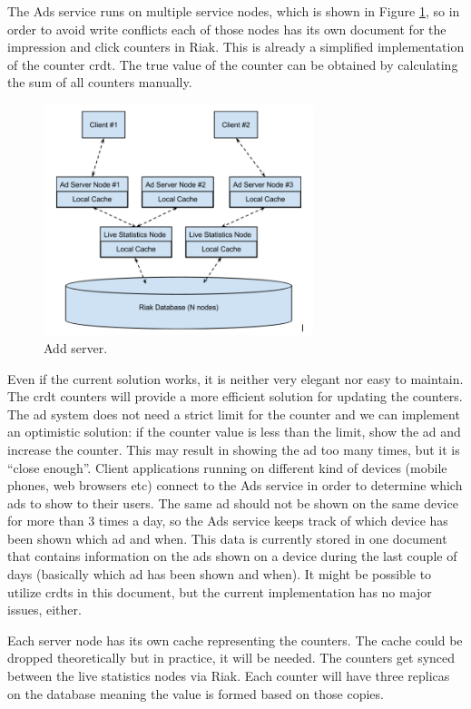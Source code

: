 \documentclass[11pt,a4paper]{report}
\begin{document}
The Ads service runs on multiple service nodes, which is shown in Figure \ref{fig:add_server}, so in order to avoid write conflicts each of those nodes has its own document for the impression and click counters in Riak. This is already a simplified implementation of the counter \gls{crdt}. The true value of the counter can be obtained by calculating the sum of all counters manually.
\begin{figure}[!h]
	\centering
	\includegraphics[width=0.7\textwidth]{./img/image1.png}
	
	\caption{Add server.}
	\label{fig:add_server}
\end{figure}

Even if the current solution works, it is neither very elegant nor easy to maintain. The \gls{crdt} counters will provide a more efficient solution for updating the counters. The ad system does not need a strict limit for the counter and we can implement an optimistic solution: if the counter value is less than the limit, show the ad and increase the counter. This may result in showing the ad too many times, but it is ``close enough''. Client applications running on different kind of devices (mobile phones, web browsers etc) connect to the Ads service in order to determine which ads to show to their users. The same ad should not be shown on the same device for more than 3 times a day, so the Ads service keeps track of which device has been shown which ad and when. This data is currently stored in one document that contains information on the ads shown on a device during the last couple of days (basically which ad has been shown and when). It might be possible to utilize \glspl{crdt} in this document, but the current implementation has no major issues, either.

Each server node has its own cache representing the counters. The cache could be dropped theoretically but in practice, it will be needed. The counters get synced between the live statistics nodes via Riak. Each counter will have three replicas on the database meaning the value is formed based on those copies.
\end{document}
